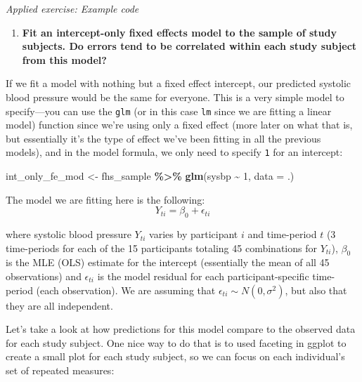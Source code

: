 \documentclass[
]{book}
\newenvironment{Shaded}{\begin{snugshade}}{\end{snugshade}}
\newcommand{\AttributeTok}[1]{\textcolor[rgb]{0.13,0.29,0.53}{#1}}
\newcommand{\DecValTok}[1]{\textcolor[rgb]{0.00,0.00,0.81}{#1}}
\newcommand{\FunctionTok}[1]{\textcolor[rgb]{0.13,0.29,0.53}{\textbf{#1}}}
\newcommand{\NormalTok}[1]{#1}
\newcommand{\OtherTok}[1]{\textcolor[rgb]{0.56,0.35,0.01}{#1}}
\newcommand{\SpecialCharTok}[1]{\textcolor[rgb]{0.81,0.36,0.00}{\textbf{#1}}}
\providecommand{\tightlist}{%
  \setlength{\itemsep}{0pt}\setlength{\parskip}{0pt}}
\begin{document}
\emph{Applied exercise: Example code}

\begin{enumerate}
\def\labelenumi{\arabic{enumi}.}
\tightlist
\item
  \textbf{Fit an intercept-only fixed effects model to the sample of study subjects. Do errors tend to be correlated within each study subject from this model?}
\end{enumerate}

If we fit a model with nothing but a fixed effect intercept, our predicted systolic
blood pressure would be the same for everyone. This is a very simple model to
specify---you can use the \texttt{glm} (or in this case \texttt{lm} since we are fitting a linear
model) function since we're using only a fixed effect (more later on what that is,
but essentially it's the type of effect we've been fitting in all the previous models),
and in the model formula, we only need to specify \texttt{1} for an intercept:

\begin{Shaded}
\begin{Highlighting}[]
\NormalTok{int\_only\_fe\_mod }\OtherTok{\textless{}{-}}\NormalTok{ fhs\_sample }\SpecialCharTok{\%\textgreater{}\%} 
  \FunctionTok{glm}\NormalTok{(sysbp }\SpecialCharTok{\textasciitilde{}} \DecValTok{1}\NormalTok{, }\AttributeTok{data =}\NormalTok{ .) }
\end{Highlighting}
\end{Shaded}

The model we are fitting here is the following:
\[
Y_{ti} = \beta_{0} + \epsilon_{ti}
\]

where systolic blood pressure \(Y_{ti}\) varies by participant \(i\) and time-period
\(t\) (3 time-periods for each of the 15 participants totaling 45 combinations
for \(Y_{ti}\)), \(\beta_{0}\) is the MLE (OLS) estimate for the intercept (essentially
the mean of all 45 observations) and \(\epsilon_{ti}\) is the model residual for each
participant-specific time-period (each observation). We are assuming that
\(\epsilon_{ti} \sim N(0,\sigma^2)\), but also that they are all independent.

Let's take a look at how predictions for this model compare to the observed data
for each study subject. One nice way to do that is to used faceting in ggplot to
create a small plot for each study subject, so we can focus on each individual's
set of repeated measures:
\end{document}

